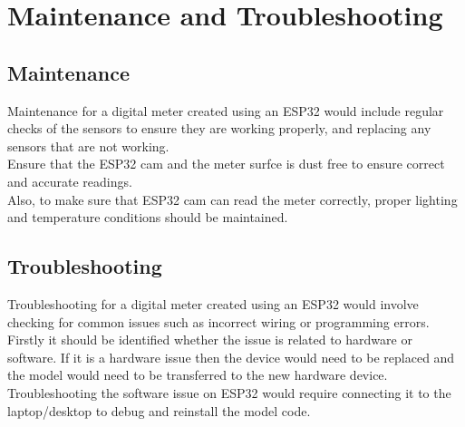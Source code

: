 %
%
%
%


\chapter{Maintenance and Troubleshooting}


\section{Maintenance}
Maintenance for a digital meter created using an ESP32 would include regular checks of the sensors to ensure they are working properly, and replacing any sensors that are not working.\\

Ensure that the ESP32 cam and the meter surfce is dust free to ensure correct and accurate readings.\\

Also, to make sure that ESP32 cam can read the meter correctly, proper lighting and temperature conditions should be maintained.\\

\section{Troubleshooting}
Troubleshooting for a digital meter created using an ESP32 would involve checking for common issues such as incorrect wiring or programming errors.\\

Firstly it should be identified whether the issue is related to hardware or software. If it is a hardware issue then the device would need to be replaced and the model would need to be transferred to the new hardware device.\\

Troubleshooting the software issue on ESP32 would require connecting it to the laptop/desktop to debug and reinstall the model code.\\

